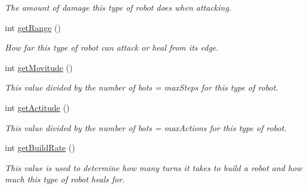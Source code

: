 \begin{DoxyCompactItemize}
\begin{DoxyCompactList}\small\item\em The amount of damage this type of robot does when attacking. \item\end{DoxyCompactList}\item 
\hypertarget{classType_adce3076747c4fddcd23901b302a10759}{
int \hyperlink{classType_adce3076747c4fddcd23901b302a10759}{getRange} ()}
\label{classType_adce3076747c4fddcd23901b302a10759}

\begin{DoxyCompactList}\small\item\em How far this type of robot can attack or heal from its edge. \item\end{DoxyCompactList}\item 
\hypertarget{classType_a3a2a8967a23b935daaf9b8cfb7be35ee}{
int \hyperlink{classType_a3a2a8967a23b935daaf9b8cfb7be35ee}{getMovitude} ()}
\label{classType_a3a2a8967a23b935daaf9b8cfb7be35ee}

\begin{DoxyCompactList}\small\item\em This value divided by the number of bots = maxSteps for this type of robot. \item\end{DoxyCompactList}\item 
\hypertarget{classType_a405a1b495a75ce84ecf954791887aa33}{
int \hyperlink{classType_a405a1b495a75ce84ecf954791887aa33}{getActitude} ()}
\label{classType_a405a1b495a75ce84ecf954791887aa33}

\begin{DoxyCompactList}\small\item\em This value divided by the number of bots = maxActions for this type of robot. \item\end{DoxyCompactList}\item 
\hypertarget{classType_a15fe354abf953676cdb4d37a90086d4b}{
int \hyperlink{classType_a15fe354abf953676cdb4d37a90086d4b}{getBuildRate} ()}
\label{classType_a15fe354abf953676cdb4d37a90086d4b}

\begin{DoxyCompactList}\small\item\em This value is used to determine how many turns it takes to build a robot and how much this type of robot heals for. \item\end{DoxyCompactList}\end{DoxyCompactItemize}
